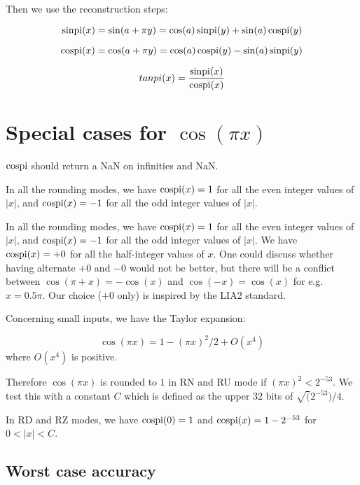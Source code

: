 Then we use the reconstruction steps:

\begin{equation}        
  \operatorname{sinpi}(x) = \sin(a + \pi y) =  \cos(a) \operatorname{sinpi}(y) +  \sin(a) \operatorname{cospi}(y) 
  \label{eq:sinpiapy}
\end{equation}

\begin{equation}
  \operatorname{cospi}(x) = \cos(a + \pi y) = \cos(a) \operatorname{cospi}(y) -  \sin(a) \operatorname{sinpi}(y) 
  \label{eq:cospiapy}
\end{equation}

\begin{equation} 
  tanpi(x) = \frac{\operatorname{sinpi}(x)}{\operatorname{cospi}(x)} 
  \label{eq:tanpiapy}
\end{equation}



\section{Special cases for $\cos(\pi x)$ }

$\operatorname{cospi}$ should return a NaN on infinities and NaN.

In all the rounding modes, we have $\operatorname{cospi}(x)=1$ for all the even integer
 values of $|x|$, and $\operatorname{cospi}(x)=-1$ for all the odd integer values of
 $|x|$.


 In all the rounding modes, we have $\operatorname{cospi}(x)=1$ for all the even
 integer values of $|x|$, and $\operatorname{cospi}(x)=-1$ for all the odd integer
 values of $|x|$. We have $\operatorname{cospi}(x)=+0$ for all the half-integer
 values of $x$. One could discuss whether having alternate $+0$ and
 $-0$ would not be better, but there will be a conflict between
 $\cos(\pi+x)=-\cos(x)$ and $\cos(-x)=\cos(x)$ for e.g. $x=0.5\pi$.
 Our choice ($+0$ only) is inspired by the LIA2 standard.


 Concerning small inputs, we have the Taylor expansion:

  \begin{equation}
    \cos(\pi x) = 1-(\pi x)^2/2 + O(x^4)\label{eq:cospiTaylor}
  \end{equation}
 where $O(x^4)$ is positive.

 Therefore $\cos(\pi x)$ is rounded to $1$ in RN and RU mode if $(\pi
 x)^2<{2^{-53}}$. We test this with a constant $C$ which is defined as
 the upper 32 bits of $\sqrt(2^{-53})/4$.

 In RD and RZ modes, we have $\operatorname{cospi}(0)=1$ and $\operatorname{cospi}(x)=1-2^{-53}$
 for $0<|x|<C$. 

\subsection{Worst case accuracy}

